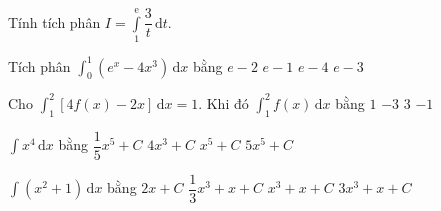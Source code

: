 \begin{bt}%

	Tính tích phân $I=\displaystyle\int\limits _1^{\mathrm{e}} \dfrac{3}{t}\mathrm{\,d}t$.
\end{bt}

\begin{ex}%
	 Tích phân $ \displaystyle\int_0^1
	(e^x-4x^3)\mathrm{\,d}x $ bằng 
	\choice 
		{\True $ e-2  $}
		{$ e-1  $}
		{$ e-4  $}
		 {$ e-3 $}
\end{ex}

\begin{ex}%
	Cho $\displaystyle\int_{1}^{2}\left[4f(x)-2x\right]\mathrm{\,d}x=1$. Khi đó $\displaystyle\int_{1}^{2}f(x)\mathrm{\,d}x$ bằng 
	\choice 
		 {\True $1$}
		 {$-3$}
		{$3$} 
		 {$-1$}
\end{ex}

\begin{ex}%
	$\displaystyle\int x^4  \mathrm{\,d} x$ bằng
	 \choice
		 {\True $\dfrac{1}{5} x^5+C$}
		{$4x^3+C$} 
		{$x^5+C$} 
		{$5x^5+C$} 
\end{ex}

\begin{ex}%
	$\displaystyle\int\left(x^2+1\right)\mathrm{\,d}x$  bằng
	\choice 
		{$2x+C$} 
		{\True $\dfrac{1}{3}x^3+x+C$} 
		{$x^3+x+C$} 
		{$3x^3+x+C$} 
\end{ex}

